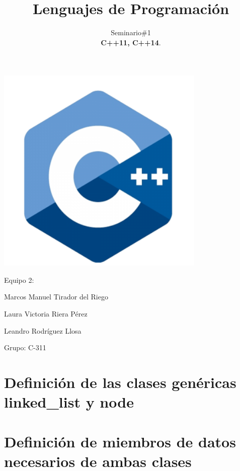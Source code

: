\documentclass[10pt]{amsart}
\title{Lenguajes de Programaci\'on}
\author{Seminario\#1\\
	 \textbf{C++11, C++14}.}
\begin{document}
	\begin{titlepage}
		\clearpage	
		\maketitle
		\begin{center}
			\includegraphics[width=10cm]{c++logo.png}
			
			\vspace{5em}
			Equipo 2:
			
			Marcos Manuel Tirador del Riego
			
			Laura Victoria Riera P\'erez
			
			Leandro Rodr\'iguez Llosa
			\vspace{1em}
			
			Grupo: C-311
		\end{center}
		\thispagestyle{empty}
	\end{titlepage}


\newpage
{}
\tableofcontents
\thispagestyle{empty}

\newpage
{}
\section{Definici\'on de las clases genéricas linked\_list y node}



\newpage
\section{Definici\'on de miembros de datos necesarios de ambas clases}
\end{document}
